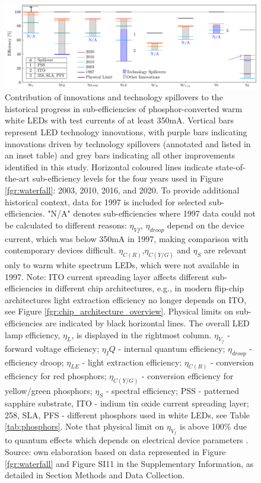 \documentclass[parskip=full]{article}
\begin{document}
\begin{figure}[h!]
 \centering
 \includegraphics[width=\textwidth]{figures/breakthroughs_efficiency.pdf}
 \caption{Contribution of innovations and technology spillovers to the historical progress in sub-efficiencies of phosphor-converted warm white LEDs with test currents of at least 350mA. Vertical bars represent LED technology innovations, with purple bars indicating innovations driven by technology spillovers (annotated and listed in an inset table) and grey bars indicating all other improvements identified in this study. Horizontal coloured lines indicate state-of-the-art sub-efficiency levels for the four years used in Figure \ref{fgr:waterfall}: 2003, 2010, 2016, and 2020. To provide additional historical context, data for 1997 is included for selected sub-efficiencies. "N/A" denotes sub-efficiencies where 1997 data could not be calculated to different reasons: $\eta_{Vf}$, $\eta_{droop}$ depend on the device current, which was below 350mA in 1997, making comparison with contemporary devices difficult. $\eta_{C(R)}$,$\eta_{C(Y/G)}$ and $\eta_S$ are relevant only to warm white spectrum LEDs, which were not available in 1997. Note: ITO current spreading layer affects different sub-efficiencies in different chip architectures, e.g., in modern flip-chip architectures light extraction efficiency no longer depends on ITO, see Figure \ref{fgr:chip_architecture_overview}. Physical limits on sub-efficiencies are indicated by black horizontal lines. The overall LED lamp efficiency, $\eta_L$, is displayed in the rightmost column. $\eta_{V_f}$ - forward voltage efficiency; $\eta_IQ$ - internal quantum efficiency; $\eta_{droop}$ - efficiency droop; $\eta_{LE}$ - light extraction efficiency; $\eta_{C(R)}$ - conversion efficiency for red phosphors; $\eta_{C(Y/G)}$ - conversion efficiency for yellow/green phosphors; $\eta_S$ - spectral efficiency; PSS - patterned sapphire substrate, ITO - indium tin oxide current spreading layer; 258, SLA, PFS - different phosphors used in white LEDs, see Table \ref{tab:phosphors}.  Note that physical limit on $\eta_{V_f}$ is above 100\% due to quantum effects which depends on electrical device parameters \cite{david2016electrical}. Source: own elaboration based on data represented in Figure \ref{fgr:waterfall} and Figure SI11 in the Supplementary Information, as detailed in Section Methods and Data Collection.}
 \label{fgr:breakthroughs_efficiency}
\end{figure}
\end{document}
